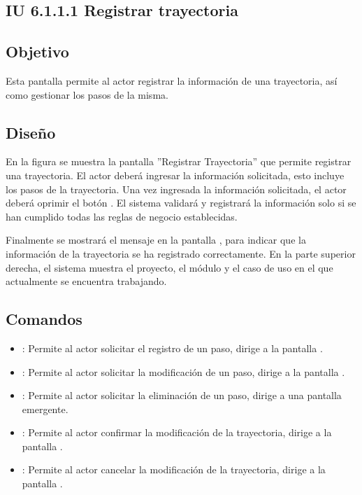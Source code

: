 \subsection{IU 6.1.1.1 Registrar trayectoria}

\subsection{Objetivo}
	Esta pantalla permite al actor registrar la información de una trayectoria, así como gestionar los pasos de la misma.
\subsection{Diseño}
	En la figura  se muestra la pantalla ''Registrar Trayectoria'' que permite registrar una trayectoria. El actor deberá ingresar la información solicitada, esto incluye los pasos de la trayectoria.
	Una vez ingresada la información solicitada, el actor deberá oprimir el botón  . El sistema validará y registrará la información solo si se han cumplido todas las reglas de negocio establecidas.
	
	Finalmente se mostrará el mensaje  en la pantalla , para indicar que la información de la trayectoria se ha registrado correctamente.
	En la parte superior derecha, el sistema muestra el proyecto, el módulo y el caso de uso en el que actualmente se encuentra trabajando.

\subsection{Comandos}
\begin{itemize}
	\item {}: Permite al actor solicitar el registro de un paso, dirige a la pantalla .
	\item \editar [Modificar]: Permite al actor solicitar la modificación de un paso, dirige a la pantalla .
	\item \eliminar [Eliminar]: Permite al actor solicitar la eliminación de un paso, dirige a una pantalla emergente.
	\item {}: Permite al actor confirmar la modificación de la trayectoria, dirige a la pantalla .
	\item {}: Permite al actor cancelar la modificación de la trayectoria, dirige a la pantalla .
\end{itemize}

